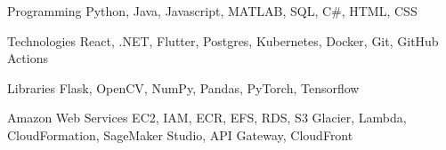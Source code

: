 
\begin{cvskills}
  \cvskill 
    {Programming}
    {Python, Java, Javascript, MATLAB, SQL, C\#, HTML, CSS}

    \cvskill 
    {Technologies}
    {React, .NET, Flutter, Postgres, Kubernetes, Docker, Git, GitHub Actions}

    \cvskill
    {Libraries}
    {Flask, OpenCV, NumPy, Pandas, PyTorch, Tensorflow}

    \cvskill 
    {Amazon Web Services}
    {EC2, IAM, ECR, EFS, RDS, S3 Glacier, Lambda, CloudFormation, SageMaker Studio, API Gateway, CloudFront}
\end{cvskills}
